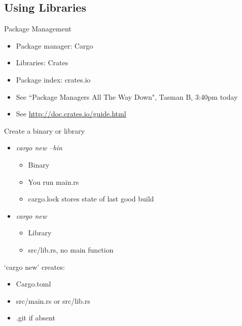 \documentclass[100pt]{beamer}
\begin{document}
\subsection{Using Libraries}

\begin{frame}
    Package Management
    \begin{itemize}
        \item Package manager: Cargo
        \item Libraries: Crates
        \item Package index: crates.io
        \item See ``Package Managers All The Way Down", Tasman B, 3:40pm today
        \item See \url{http://doc.crates.io/guide.html}
    \end{itemize}
\end{frame}

\begin{frame}
    Create a binary or library
    \begin{itemize}
        \item \textit{cargo new --bin}
            \begin{itemize}
                \item Binary
                \item You run main.rs
                \item cargo.lock stores state of last good build
            \end{itemize}
        \item \textit{cargo new}
            \begin{itemize}
                \item Library
                \item src/lib.rs, no main function
            \end{itemize}
    \end{itemize}
\end{frame}

\begin{frame}
    `cargo new' creates:
    \begin{itemize}
        \item Cargo.toml
        \item src/main.rs or src/lib.rs
        \item .git if absent
    \end{itemize}
\end{frame}
\end{document}
